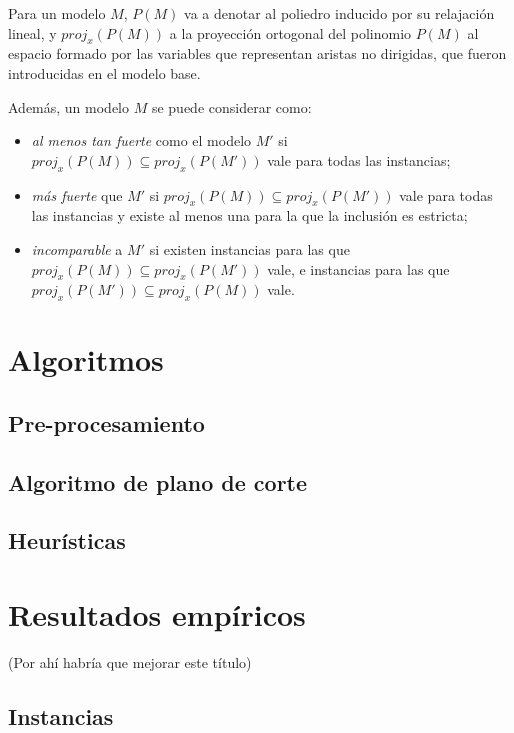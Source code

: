 \documentclass[10pt, a4paper]{article}
\theoremstyle{definition}
\begin{document}
Para un modelo $M$, $P(M)$ va a denotar al poliedro inducido por su relajación lineal, y $proj_{x}(P(M))$ a la proyección ortogonal del polinomio $P(M)$ al espacio formado por las variables que representan aristas no dirigidas, que fueron introducidas en el modelo base.

Además, un modelo $M$ se puede considerar como:

\begin{itemize}
	\item \textit{al menos tan fuerte} como el modelo $M'$ si $proj_{x}(P(M)) \subseteq proj_{x}(P(M'))$ vale para todas las instancias;
	\item \textit{más fuerte} que $M'$ si $proj_{x}(P(M)) \subseteq proj_{x}(P(M'))$ vale para todas las instancias y existe al menos una para la que la inclusión es estricta;
	\item \textit{incomparable} a $M'$ si existen instancias para las que $proj_{x}(P(M)) \subseteq proj_{x}(P(M'))$ vale, e instancias para las que $proj_{x}(P(M')) \subseteq proj_{x}(P(M))$ vale.
\end{itemize}

\section{Algoritmos}
  
\subsection{Pre-procesamiento}

\subsection{Algoritmo de plano de corte}

\subsection{Heurísticas}

\section{Resultados empíricos}

(Por ahí habría que mejorar este título)

\subsection{Instancias}
\end{document}
